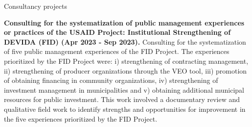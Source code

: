 \documentclass{resume} %
\begin{document}
\begin{rSection}{Consultancy projects}
\item \textbf{Consulting for the systematization of public management experiences or practices of the USAID Project: Institutional Strengthening of DEVIDA (FID) (Apr 2023 - Sep 2023).} {Consulting for the systematization of five public management experiences of the FID Project. The experiences prioritized by the FID Project were: i) strengthening of contracting management, ii) strengthening of producer organizations through the VEO tool, iii) promotion of obtaining financing in community organizations, iv) strengthening of investment management in municipalities and v) obtaining additional municipal resources for public investment. This work involved a documentary review and qualitative field work to identify strengths and opportunities for improvement in the five experiences prioritized by the FID Project.}
\end{rSection} 
\pagebreak
\end{document}
